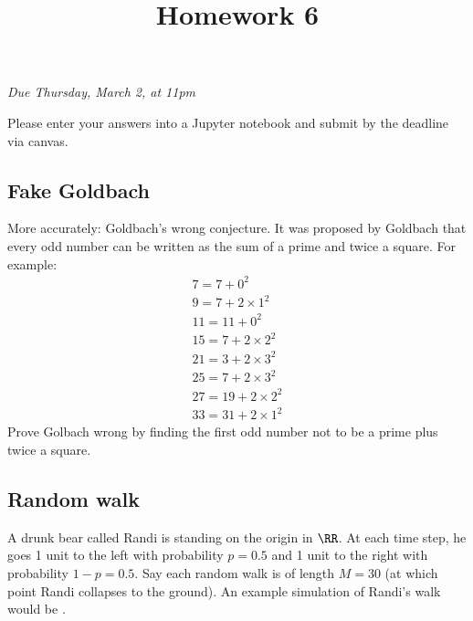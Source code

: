 \documentclass[letterpaper,11pt]{amsart}
\title{Homework 6}
\date{}
\theoremstyle{plain}
\theoremstyle{definition}
\begin{document}
\maketitle
\begin{center}
  \emph{Due Thursday, March 2, at 11pm}
  \vspace{0.3in}
  \end{center}


\noindent Please enter your answers into a Jupyter notebook and submit by the deadline via canvas. 

\subsection*{Fake Goldbach} More accurately: Goldbach's wrong conjecture. It was proposed by Goldbach that every odd number can be written as the sum of a prime and twice a square. For example:
\begin{eqnarray*}
7 = 7 + 0^2\\
9 = 7 + 2\times 1^2\\
11 = 11 + 0^2\\
15 = 7 + 2\times2^2 \\
21 = 3 + 2\times3^2\\
25 = 7 + 2\times3^2\\
27 = 19 + 2\times2^2\\
33 = 31 + 2\times1^2
\end{eqnarray*}
Prove Golbach wrong by finding the first odd number not to be a prime plus twice a square.

\subsection*{Random walk} A drunk bear called Randi is standing on the origin in $\RR$. At each time step, he goes 1 unit to the left with probability $p = 0.5$ and 1 unit to the right with probability $1-p = 0.5$. Say each random walk is of length $M = 30$ (at which point Randi collapses to the ground). An example simulation of Randi's walk would be \code{[1,0,1,2,1,0,-1,-2,\dots,-3]}.
\end{document}
